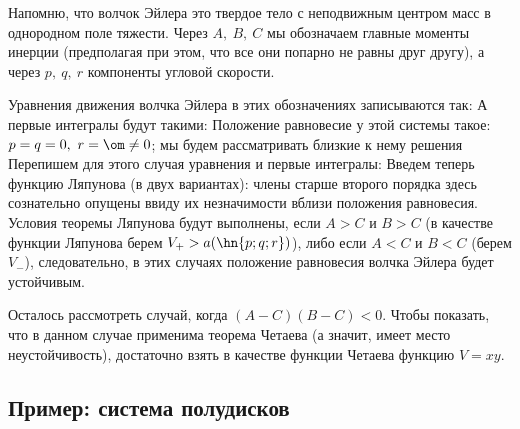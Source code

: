\begin{nbb}
Напомню, что волчок Эйлера это твердое тело с неподвижным центром масс в однородном поле
тяжести. Через $A,\ B,\ C$ мы обозначаем главные моменты инерции (предполагая при этом, что все они
попарно не равны друг другу), а через $p,\ q,\ r$ компоненты угловой скорости.
\end{nbb}
Уравнения движения волчка Эйлера в этих обозначениях записываются так:  А первые интегралы будут такими:  Положение равновесие у этой системы такое: $p=q=0,\ r=\om\neq0$; мы будем рассматривать близкие к
нему решения  Перепишем для этого случая уравнения и первые интегралы:
Введем теперь функцию Ляпунова (в двух вариантах):
члены старше второго порядка здесь сознательно опущены ввиду их незначимости вблизи положения
равновесия. Условия теоремы Ляпунова будут выполнены, если $A>C$ и $B>C$ (в качестве функции
Ляпунова берем $V_{+}>a(\hn{p;q;r})$), либо если $A<C$ и $B<C$ (берем $V_{-}$), следовательно, в
этих случаях положение равновесия волчка Эйлера будет устойчивым.

Осталось рассмотреть случай, когда $(A-C)(B-C)<0$. Чтобы показать, что в данном случае применима
теорема Четаева (а значит, имеет место неустойчивость), достаточно взять в качестве функции Четаева
функцию $V=xy$.



\subsection{Пример: система полудисков}

